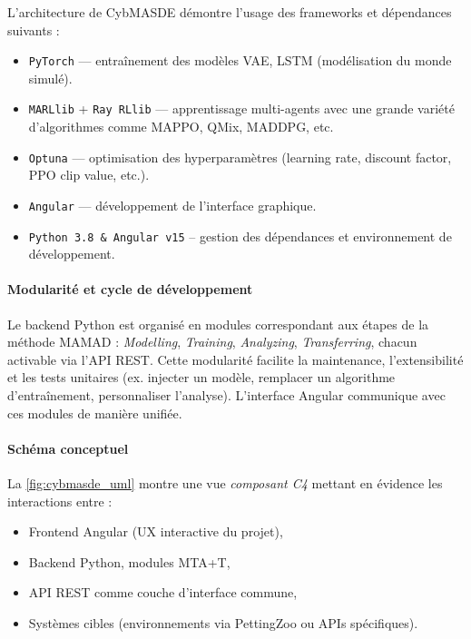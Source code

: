 L’architecture de CybMASDE démontre l’usage des frameworks et dépendances suivants :
\begin{itemize}
  \item \texttt{PyTorch} — entraînement des modèles VAE, LSTM (modélisation du monde simulé).
  \item \texttt{MARLlib} + \texttt{Ray RLlib} — apprentissage multi-agents avec une grande variété d'algorithmes comme MAPPO, QMix, MADDPG, etc.
  \item \texttt{Optuna} — optimisation des hyperparamètres (learning rate, discount factor, PPO clip value, etc.).
  \item \texttt{Angular} — développement de l’interface graphique.
  \item \texttt{Python 3.8 \& Angular v15} -- gestion des dépendances et environnement de développement.
\end{itemize}



\paragraph{Modularité et cycle de développement}
Le backend Python est organisé en modules correspondant aux étapes de la méthode MAMAD :
\textit{Modelling}, \textit{Training}, \textit{Analyzing}, \textit{Transferring}, chacun activable via l’API REST.
Cette modularité facilite la maintenance, l’extensibilité et les tests unitaires (ex. injecter un modèle, remplacer un algorithme d’entraînement, personnaliser l’analyse). L’interface Angular communique avec ces modules de manière unifiée.

\paragraph{Schéma conceptuel}
La \autoref{fig:cybmasde_uml} montre une vue \textit{composant C4} mettant en évidence les interactions entre :
\begin{itemize}
  \item \textsf{Frontend Angular} (UX interactive du projet),
  \item \textsf{Backend Python}, modules MTA+T,
  \item \textsf{API REST} comme couche d’interface commune,
  \item \textsf{Systèmes cibles} (environnements via PettingZoo ou APIs spécifiques).
\end{itemize}

